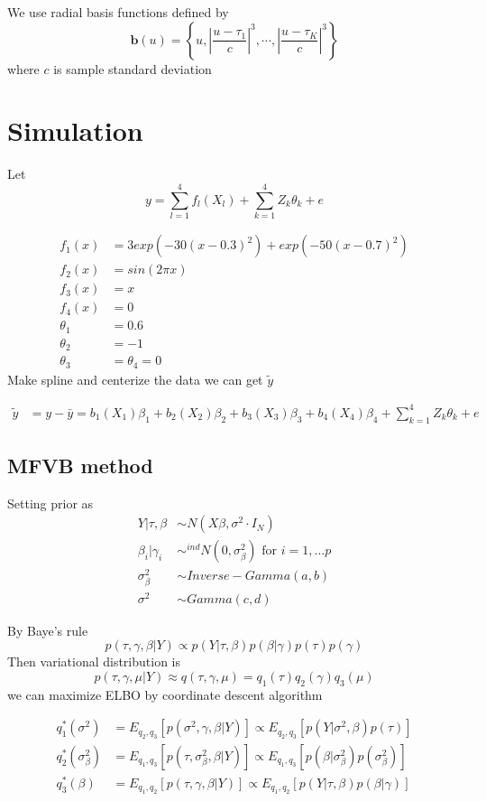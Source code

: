 \documentclass[11pt]{article}
\begin{document}
	We use radial basis functions defined by
	$$
	\mathbf{b}(u) = \left\{  u, \left| \frac{u-\tau_1}{c} \right|^3 , \cdots , \left| \frac{u-\tau_K}{c} \right|^3 \right\}
	$$
	where $c$ is sample standard deviation 
	
	\section{Simulation}
	Let
	$$y = \sum_{l=1}^{4} f_l(X_l) + \sum_{k=1}^{4} Z_k \theta_k + e $$
	
	\begin{align*}
	f_1(x) &= 3exp(-30(x-0.3)^2)+exp(-50(x-0.7)^2)\\
	f_2(x) &= sin(2\pi x)\\
	f_3(x) &= x \\
	f_4(x) &= 0\\
	\theta_1 &= 0.6\\
	\theta_2 &= -1\\
	\theta_3&=\theta_4 = 0
	\end{align*}
	Make spline and centerize the data we can get $\tilde{y}$
	
	\begin{align*}
	\tilde{y} &= y -\bar{y} = b_1(X_1)\beta_1 + b_2(X_2)\beta_2 + b_3(X_3)\beta_3 + b_4(X_4)\beta_4 + \sum_{k=1}^{4} Z_k \theta_k + e
	\end{align*}
	
	
	\subsection{MFVB method}
	
	Setting prior as
	\begin{align*}
	Y|\tau,\beta  &\sim N(X\beta , \sigma^2 \cdot I_N)\\
	\beta_i | \gamma_i &\sim^{ind} N(0,\sigma_{\beta}^2) \text{ for } i=1,\dots p \\
	\sigma_{\beta}^2 &\sim Inverse-Gamma(a,b) \\
	\sigma^2 &\sim Gamma(c,d)   
	\end{align*}
	
	
	
	By Baye's rule
	$$
	p(\tau,\gamma ,\beta | Y) \propto p(Y|\tau,\beta) p(\beta | \gamma) p(\tau) p(\gamma) 
	$$
	Then variational distribution is
	$$
	p(\tau,\gamma ,\mu | Y) \approx q(\tau,\gamma,\mu) = q_1(\tau) q_2(\gamma) q_3(\mu)
	$$
	we can maximize ELBO by coordinate descent algorithm
	
	\begin{align*}
	q_1^*(\sigma^2) &= E_{q_2,q_3}[p(\sigma^2,\gamma ,\beta | Y)] \propto E_{q_2,q_3}[p(Y|\sigma^2,\beta)  p(\tau)]\\
	q_2^*(\sigma_{\beta}^2) &= E_{q_1,q_3}[p(\tau,\sigma_{\beta}^2 ,\beta | Y)] \propto E_{q_1,q_3}[ p(\beta | \sigma_{\beta}^2)   p(\sigma_{\beta}^2)]\\
	q_3^*(\beta) &= E_{q_1,q_2}[p(\tau,\gamma ,\beta | Y)] \propto E_{q_1,q_2}[p(Y|\tau,\beta) p(\beta | \gamma)   ]\\
	\end{align*}
	
\end{document}
